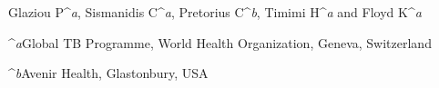 Glaziou P^\textit{a}, Sismanidis C^\textit{a}, Pretorius C^\textit{b}, Timimi H^\textit{a} and Floyd K^\textit{a}

^\textit{a}Global TB Programme, World Health Organization, Geneva, Switzerland

^\textit{b}Avenir Health, Glastonbury, USA